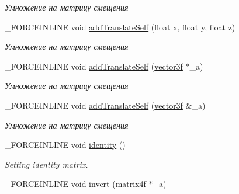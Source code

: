 \begin{DoxyCompactItemize}
\begin{DoxyCompactList}\small\item\em Умножение на матрицу смещения \end{DoxyCompactList}\item 
\hypertarget{classbt_1_1matrix4f_a6f9d2786460ad93f4a1e136ab12f584c}{\-\_\-\-F\-O\-R\-C\-E\-I\-N\-L\-I\-N\-E void \hyperlink{classbt_1_1matrix4f_a6f9d2786460ad93f4a1e136ab12f584c}{add\-Translate\-Self} (float x, float y, float z)}\label{classbt_1_1matrix4f_a6f9d2786460ad93f4a1e136ab12f584c}

\begin{DoxyCompactList}\small\item\em Умножение на матрицу смещения \end{DoxyCompactList}\item 
\hypertarget{classbt_1_1matrix4f_a02203d55ad3daec4bad640310545cfbd}{\-\_\-\-F\-O\-R\-C\-E\-I\-N\-L\-I\-N\-E void \hyperlink{classbt_1_1matrix4f_a02203d55ad3daec4bad640310545cfbd}{add\-Translate\-Self} (\hyperlink{classbt_1_1vector3f}{vector3f} $\ast$\-\_\-a)}\label{classbt_1_1matrix4f_a02203d55ad3daec4bad640310545cfbd}

\begin{DoxyCompactList}\small\item\em Умножение на матрицу смещения \end{DoxyCompactList}\item 
\hypertarget{classbt_1_1matrix4f_ac238b74fb5fb82013026b6888c24f6ca}{\-\_\-\-F\-O\-R\-C\-E\-I\-N\-L\-I\-N\-E void \hyperlink{classbt_1_1matrix4f_ac238b74fb5fb82013026b6888c24f6ca}{add\-Translate\-Self} (\hyperlink{classbt_1_1vector3f}{vector3f} \&\-\_\-a)}\label{classbt_1_1matrix4f_ac238b74fb5fb82013026b6888c24f6ca}

\begin{DoxyCompactList}\small\item\em Умножение на матрицу смещения \end{DoxyCompactList}\item 
\hypertarget{classbt_1_1matrix4f_a9d818266ad027942698c67380ab66e2f}{\-\_\-\-F\-O\-R\-C\-E\-I\-N\-L\-I\-N\-E void \hyperlink{classbt_1_1matrix4f_a9d818266ad027942698c67380ab66e2f}{identity} ()}\label{classbt_1_1matrix4f_a9d818266ad027942698c67380ab66e2f}

\begin{DoxyCompactList}\small\item\em Setting identity matrix. \end{DoxyCompactList}\item 
\hypertarget{classbt_1_1matrix4f_aba772613c65199b3e2fb565f0b211ab2}{\-\_\-\-F\-O\-R\-C\-E\-I\-N\-L\-I\-N\-E void \hyperlink{classbt_1_1matrix4f_aba772613c65199b3e2fb565f0b211ab2}{invert} (\hyperlink{classbt_1_1matrix4f}{matrix4f} $\ast$\-\_\-a)}\label{classbt_1_1matrix4f_aba772613c65199b3e2fb565f0b211ab2}


\end{DoxyCompactItemize}
